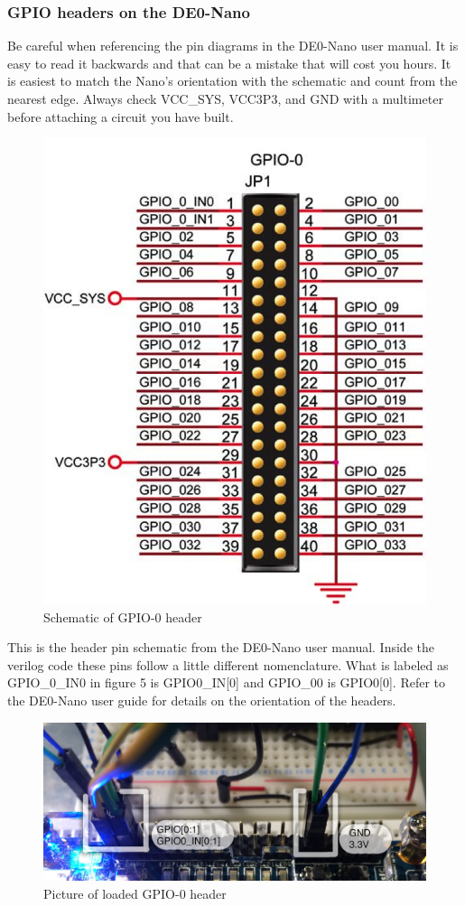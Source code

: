 \documentclass[12pt,journal]{IEEEtran}
\begin{document}
      \subsubsection{\bfseries GPIO headers on the DE0-Nano}
        Be careful when referencing the pin diagrams in the DE0-Nano user manual. It is easy to read it backwards and
        that can be a mistake that will cost you hours. It is easiest to match the Nano's orientation with the schematic
        and count from the nearest edge. Always check VCC\_SYS, VCC3P3, and GND with a multimeter before attaching a circuit
        you have built. 
        \begin{figure}[H]
          \includegraphics[width=.48\textwidth]{Images/GPIOHeader.jpg}
          \caption{Schematic of GPIO-0 header\cite{DE0Manual}}
        \end{figure}
        This is the header pin schematic from the DE0-Nano user manual. Inside the verilog code these pins follow a little
        different nomenclature. What is labeled as GPIO\_0\_IN0 in figure 5 is GPIO0\_IN[0] and GPIO\_00 is GPIO0[0]. Refer
        to the DE0-Nano user guide for details on the orientation of the headers.

        \begin{figure}[H]
          \includegraphics[width=.45\textwidth]{Images/GPIOpicture.jpg}
          \caption{Picture of loaded GPIO-0 header}
        \end{figure}
\end{document}

